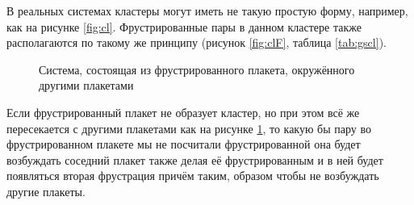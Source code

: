 \documentclass[utf8, babel, sor, jor, amsmath, amssymb, reprint]{elsarticle} %
\begin{document}
В реальных системах кластеры могут иметь не такую простую форму, например, как на рисунке \ref{fig:cl}. Фрустрированные пары в данном кластере также располагаются по такому же принципу (рисунок \ref{fig:clF}, таблица \ref{tab:gscl}).


\begin{figure}[h]
	\centering
	\caption{Система, состоящая из фрустрированного плакета, окружённого другими плакетами}
	\label{fig:4x4}
\end{figure}

Если фрустрированный плакет не образует кластер, но при этом всё же пересекается с другими плакетами как на рисунке \ref{fig:4x4}, то какую бы пару во фрустрированном плакете мы не посчитали фрустрированной она будет возбуждать соседний плакет также делая её фрустрированным и в ней будет появляться вторая фрустрация причём таким, образом чтобы не возбуждать другие плакеты. 
\end{document}
